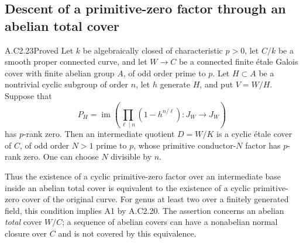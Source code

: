 \subsection{Descent of a primitive-zero factor through an abelian total cover}

\begin{claim}{A.C2.23}{Proved}
Let $k$ be algebraically closed of characteristic $p>0$,
let $C/k$ be a smooth proper connected curve, and let
$W\to C$ be a connected finite \'{e}tale Galois cover
with finite abelian group $A$, of odd order prime to $p$.
Let $H\subset A$ be a nontrivial cyclic subgroup of
order $n$, let $h$ generate $H$, and put $V=W/H$.
Suppose that
\[
 P_H=\operatorname{im}\left(
       \prod_{\ell\mid n}(1-h^{n/\ell}):J_W\longrightarrow J_W
                         \right)
\]
has $p$-rank zero. Then an intermediate quotient
$D=W/K$ is a cyclic \'{e}tale cover of $C$, of odd
order $N>1$ prime to $p$, whose primitive conductor-$N$
factor has $p$-rank zero. One can choose $N$ divisible
by $n$.

Thus the existence of a cyclic primitive-zero factor
over an intermediate base inside an abelian total cover
is equivalent to the existence of a cyclic
primitive-zero cover of the original curve.
For genus at least two over a finitely generated field,
this condition implies A1 by A.C2.20.
The assertion concerns an abelian \emph{total} cover
$W/C$; a sequence of abelian covers can have a
nonabelian normal closure over $C$ and is not
covered by this equivalence.
\end{claim}
